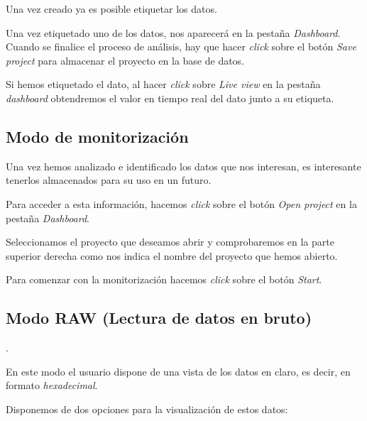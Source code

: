 
Una vez creado ya es posible etiquetar los datos.

Una vez etiquetado uno de los datos, nos aparecerá en la pestaña \emph{Dashboard}. Cuando se finalice el proceso de análisis, hay que hacer \emph{click} sobre el botón \textit{Save project} para almacenar el proyecto en la base de datos.

Si hemos etiquetado el dato, al hacer \emph{click} sobre \textit{Live view} en la pestaña \emph{dashboard} obtendremos el valor en tiempo real del dato junto a su etiqueta.



\subsection{Modo de monitorización}

Una vez hemos analizado e identificado los datos que nos interesan, es interesante tenerlos almacenados para su uso en un futuro.

Para acceder a esta información, hacemos \emph{click} sobre el botón \textit{Open project} en la pestaña \textit{Dashboard}.


Seleccionamos el proyecto que deseamos abrir y comprobaremos en la parte superior derecha como nos indica el nombre del proyecto que hemos abierto.

Para comenzar con la monitorización hacemos \emph{click} sobre el botón \textit{Start}.




\subsection{Modo RAW (Lectura de datos en bruto)}.

En este modo el usuario dispone de una vista de los datos en claro, es decir, en formato \emph{hexadecimal}.

Disponemos de dos opciones para la visualización de estos datos:

